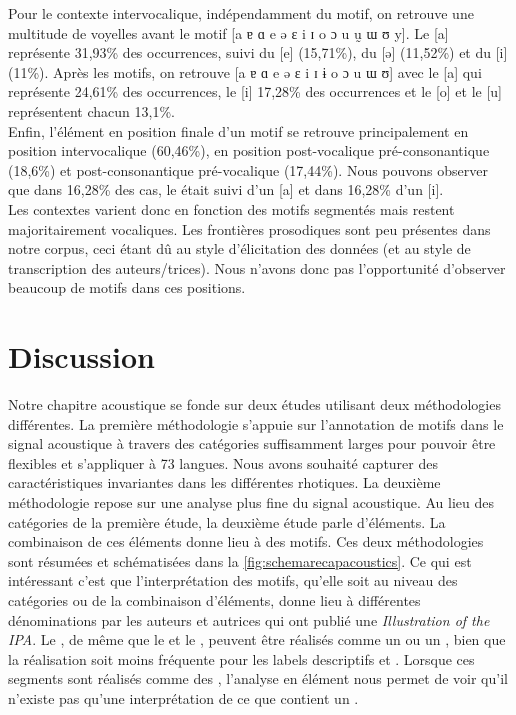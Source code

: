 Pour le contexte intervocalique, indépendamment du motif, on retrouve une multitude de voyelles avant le motif [a ɐ ɑ e ə ɛ i ɪ o ɔ u ṵ ɯ ʊ y]. Le [a] représente 31,93\% des occurrences, suivi du [e] (15,71\%), du [ə] (11,52\%) et du [i] (11\%). Après les motifs, on retrouve [a ɐ ɑ e ə ɛ i ɪ ɨ o ɔ u ɯ ʊ] avec le [a] qui représente 24,61\% des occurrences, le [i] 17,28\% des occurrences et le [o] et le [u] représentent chacun 13,1\%.\\

Enfin, l'élément  en position finale d'un motif se retrouve principalement en position intervocalique (60,46\%), en position post-vocalique pré-consonantique (18,6\%) et post-consonantique pré-vocalique (17,44\%). Nous pouvons observer que dans 16,28\% des cas, le  était suivi d'un [a] et dans 16,28\% d'un [i].\\

Les contextes varient donc en fonction des motifs segmentés mais restent majoritairement vocaliques. Les frontières prosodiques sont peu présentes dans notre corpus, ceci étant dû au style d'élicitation des données (et au style de transcription des auteurs/trices). Nous n'avons donc pas l'opportunité d'observer beaucoup de motifs dans ces positions.

\section{Discussion}


	
Notre chapitre acoustique se fonde sur deux études utilisant deux méthodologies différentes. La première méthodologie s'appuie sur l'annotation de motifs dans le signal acoustique à travers des catégories suffisamment larges pour pouvoir être flexibles et s'appliquer à 73 langues. Nous avons souhaité capturer des caractéristiques invariantes dans les différentes rhotiques. 
La deuxième méthodologie repose sur une analyse plus fine du signal acoustique. Au lieu des catégories de la première étude, la deuxième étude parle d'éléments. La combinaison de ces éléments donne lieu à des motifs. Ces deux méthodologies sont résumées et schématisées dans la \autoref{fig:schemarecapacoustics}. Ce qui est intéressant c'est que l'interprétation des motifs, qu'elle soit au niveau des catégories ou de la combinaison d'éléments, donne lieu à différentes dénominations par les auteurs et autrices qui ont publié une \textit{Illustration of the IPA}. Le , de même que le  et le , peuvent être réalisés comme un  ou un , bien que la réalisation  soit moins fréquente pour les labels descriptifs  et . Lorsque ces segments sont réalisés comme des , l'analyse en élément nous permet de voir qu'il n'existe pas qu'une interprétation de ce que contient un .\\ 

